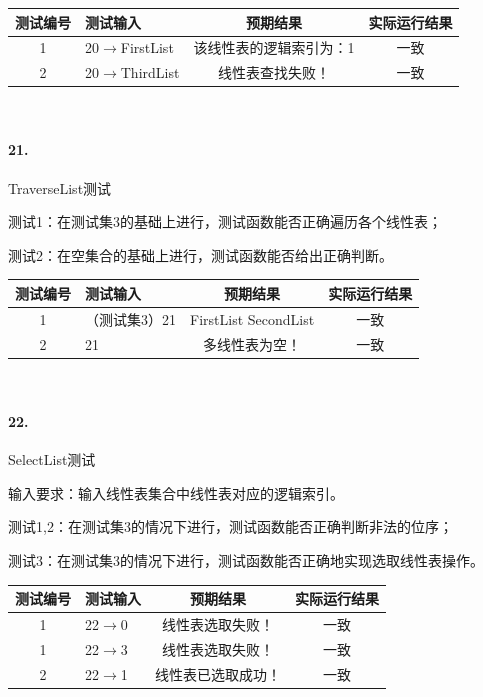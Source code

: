 \documentclass[supercite]{Experimental_Report}
\theoremstyle{definition}
\begin{document}
\begin{tabular}{|c|p{2.7cm}|c|c|}
	\hline
	测试编号 & 测试输入 & 预期结果 & 实际运行结果 \\
	\hline
	1 & 20$\rightarrow$FirstList & 该线性表的逻辑索引为：1 & 一致 \\
	\hline
	2 & 20$\rightarrow$ThirdList & 线性表查找失败！ & 一致 \\
	\hline
\end{tabular}

~\

\paragraph{21.}TraverseList测试
	
测试1：在测试集3的基础上进行，测试函数能否正确遍历各个线性表；

测试2：在空集合的基础上进行，测试函数能否给出正确判断。

\vspace{0.5em}

\begin{tabular}{|c|p{2.7cm}|c|c|}
	\hline
	测试编号 & 测试输入 & 预期结果 & 实际运行结果 \\
	\hline
	1 & （测试集3）21 & FirstList SecondList & 一致 \\
	\hline
	2 & 21 & 多线性表为空！ & 一致 \\
	\hline
\end{tabular}

~\

\paragraph{22.}SelectList测试
	
输入要求：输入线性表集合中线性表对应的逻辑索引。
	
测试1,2：在测试集3的情况下进行，测试函数能否正确判断非法的位序；

测试3：在测试集3的情况下进行，测试函数能否正确地实现选取线性表操作。

\vspace{0.5em}

\begin{tabular}{|c|p{2.7cm}|c|c|}
	\hline
	测试编号 & 测试输入 & 预期结果 & 实际运行结果 \\
	\hline
	1 & 22$\rightarrow$0 & 线性表选取失败！ & 一致 \\
	\hline
	1 & 22$\rightarrow$3 & 线性表选取失败！ & 一致 \\
	\hline
	2 & 22$\rightarrow$1 & 线性表已选取成功！ & 一致 \\
	\hline
\end{tabular}
\end{document}
